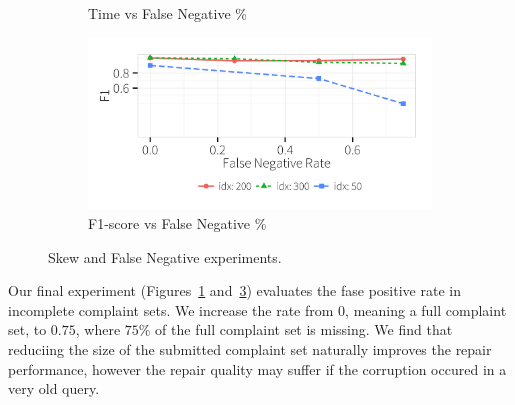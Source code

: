 \begin{figure}[h]
\begin{subfigure}[t]{.23\textwidth}
    \caption{Time vs False Negative \%}
    \label{f:falsenegative_time} 
    \end{subfigure}
    \begin{subfigure}[t]{.23\textwidth}
    \includegraphics[width = .9\columnwidth]{figures/noise_fn_acc}
    \caption{F1-score vs False Negative \%}
    \label{f:falsenegative_acc} 
    \end{subfigure}
    \vspace*{-.1in}
    \caption{Skew and False Negative experiments. }
  \end{figure}





Our final experiment (Figures~\ref{f:falsenegative_time} and~\ref{f:falsenegative_acc}) evaluates the fase positive rate in incomplete complaint sets.
We increase the rate from $0$, meaning a full complaint set, to $0.75$, where 
$75\%$ of the full complaint set is missing.  
We find that reduciing the size of the submitted complaint set naturally improves the repair performance,
however the repair quality may suffer if the corruption occured in a very old query.


% 

